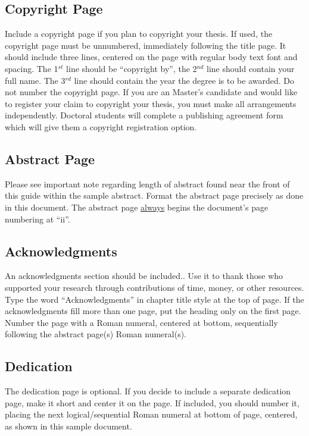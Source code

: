 \subsection{Copyright Page}

Include a copyright page if you plan to copyright your thesis.  If used, the
copyright page must be unnumbered, immediately following the title page.  It
should include three lines, centered on the page with regular body text font
and spacing.  The 1$^{st}$ line should be ``copyright by'', the 2$^{nd}$ line
should contain your full name.  The 3$^{rd}$ line should contain the year the
degree is to be awarded.  Do not number the copyright page.  If you are an
Master's candidate and would like to register your claim to copyright your
thesis, you must make all arrangements independently.  Doctoral students will
complete a publishing agreement form which will give them a copyright
registration option.

\subsection{Abstract Page}

Please see important note regarding length of abstract found near the front of
this guide within the sample abstract.  Format the abstract page precisely as
done in this document.  The abstract page \uline{always} begins the document's
page numbering at ``ii''.

\subsection{Acknowledgments}

An acknowledgments section should be included..  Use it to thank those who
supported your research through contributions of time, money, or other
resources.  Type the word ``Acknowledgments'' in chapter title style at the top
of page.  If the acknowledgments fill more than one page, put the heading only
on the first page.  Number the page with a Roman numeral, centered at bottom,
sequentially following the abstract page(s) Roman numeral(s).

\subsection{Dedication}

The dedication page is optional.  If you decide to include a separate
dedication page,  make it short and center it on the page.  If included, you
should number it, placing the next logical/sequential Roman numeral at bottom
of page, centered, as shown in this sample document.

